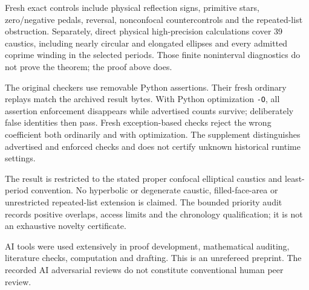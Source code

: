 \documentclass[11pt]{article}
\begin{document}
Fresh exact controls include physical reflection signs, primitive
stars, zero/negative pedals, reversal, nonconfocal countercontrols and
the repeated-list obstruction. Separately, direct physical
high-precision calculations cover 39 caustics, including nearly
circular and elongated ellipses and every admitted coprime winding
in the selected periods. Those finite noninterval diagnostics do
not prove the theorem; the proof above does.

The original checkers use removable Python assertions.
Their fresh ordinary replays match the archived result bytes.
With Python optimization \texttt{-O}, all assertion enforcement
disappears while advertised counts survive; deliberately false
identities then pass. Fresh exception-based checks reject the
wrong coefficient both ordinarily and with optimization.
The supplement distinguishes advertised and enforced checks and
does not certify unknown historical runtime settings.

The result is restricted to the stated proper confocal elliptical
caustics and least-period convention. No hyperbolic or degenerate
caustic, filled-face-area or unrestricted repeated-list extension
is claimed. The bounded priority audit records positive overlaps,
access limits and the chronology qualification; it is not an
exhaustive novelty certificate.

AI tools were used extensively in proof development, mathematical
auditing, literature checks, computation and drafting.
This is an unrefereed preprint. The recorded AI adversarial reviews
do not constitute conventional human peer review.
\end{document}
